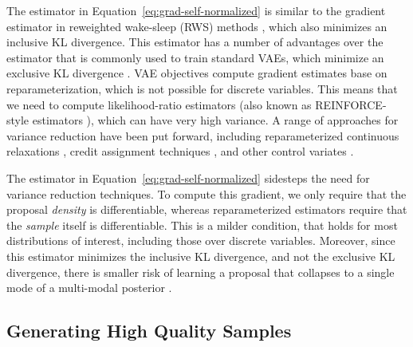\documentclass{article}
\theoremstyle{definition}
\begin{document}
The estimator in Equation~\ref{eq:grad-self-normalized} is similar to the gradient estimator in reweighted wake-sleep (RWS) methods \cite{bornschein2014reweighted}, which also minimizes an inclusive KL divergence. This estimator has a number of advantages over the estimator that is commonly used to train standard VAEs, which minimize an exclusive KL divergence \cite{le2019revisiting}. VAE objectives compute gradient estimates base on reparameterization, which is not possible for discrete variables. This means that we need to compute likelihood-ratio estimators (also known as REINFORCE-style estimators \cite{williams1992simple}), which can have very high variance. A range of approaches for variance reduction have been put forward, including reparameterized continuous relaxations \cite{maddison2017concrete,jang2017categorical}, credit assignment techniques \cite{weber2019credit}, and other control variates \cite{mnih2016variational,tucker2017rebar,grathwohl2018backpropagation}. 

The estimator in Equation~\ref{eq:grad-self-normalized} sidesteps the need for variance reduction techniques. To compute this gradient, we only require that the proposal \emph{density} is differentiable, whereas reparameterized estimators require that the \emph{sample} itself is differentiable. This is a milder condition, that holds for most distributions of interest, including those over discrete variables. Moreover, since this estimator minimizes the inclusive KL divergence, and not the exclusive KL divergence, there is smaller risk of learning a proposal that collapses to a single mode of a multi-modal posterior \cite{le2019revisiting}.

\subsection{Generating High Quality Samples}
\end{document}
